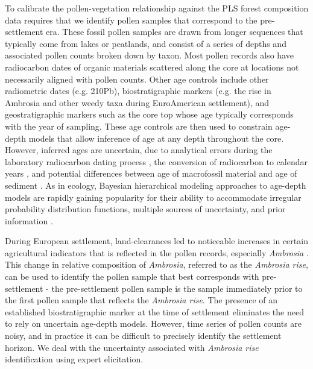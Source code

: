 \documentclass[12pt]{article}
\begin{document}
To calibrate the pollen-vegetation relationship against the PLS forest
composition data requires that we identify pollen samples that
correspond to the pre-settlement era. These fossil pollen samples are
drawn from longer sequences that typically come from lakes or
peatlands, and consist of a series of depths and associated pollen
counts broken down by taxon. Most pollen records also have radiocarbon
dates of organic materials scattered along the core at locations not
necessarily aligned with pollen counts. Other age controls include
other radiometric dates (e.g. 210Pb), biostratigraphic markers
(e.g. the rise in Ambrosia and other weedy taxa during EuroAmerican
settlement), and geostratigraphic markers such as the core top whose
age typically corresponds with the year of sampling. These age
controls are then used to constrain age-depth models that allow
inference of age at any depth throughout the core. However, inferred
ages are uncertain, due to analytical errors during the laboratory
radiocarbon dating process \citep{ward1978procedures}, the conversion
of radiocarbon to calendar years \citep{reimer2013intcal13}, and
potential differences between age of macrofossil material and age of
sediment \citep{blois2011methodological}. As in ecology, Bayesian
hierarchical modeling approaches to age-depth models are rapidly
gaining popularity for their ability to accommodate irregular
probability distribution functions, multiple sources of uncertainty,
and prior information \citep{blaauw2011flexible, buck1999bcal,
  blaauw2005radiocarbon, ramsey1995radiocarbon}.

During European settlement, land-clearances led to noticeable
increases in certain agricultural indicators that is reflected in the
pollen records, especially \textit{Ambrosia}
\citep{mcandrews1988human}. This change in relative composition of
\textit{Ambrosia}, referred to as the \textit{Ambrosia rise}, can be
used to identify the pollen sample that best corresponds with
pre-settlement - the pre-settlement pollen sample is the sample
immediately prior to the first pollen sample that reflects the
\textit{Ambrosia rise}. The presence of an established
biostratigraphic marker at the time of settlement eliminates the need
to rely on uncertain age-depth models. However, time series of pollen
counts are noisy, and in practice it can be difficult to precisely
identify the settlement horizon. We deal with the uncertainty
associated with \textit{Ambrosia rise} identification using expert
elicitation. 

\end{document}
